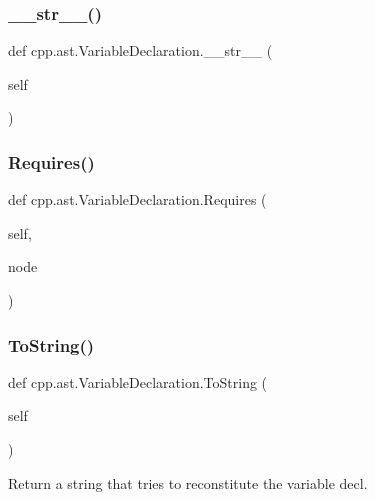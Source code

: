 \subsubsection{\texorpdfstring{\+\_\+\+\_\+str\+\_\+\+\_\+()}{\_\_str\_\_()}}
{\footnotesize\ttfamily def cpp.\+ast.\+Variable\+Declaration.\+\_\+\+\_\+str\+\_\+\+\_\+ (\begin{DoxyParamCaption}\item[{}]{self }\end{DoxyParamCaption})}

\mbox{\label{classcpp_1_1ast_1_1_variable_declaration_aaa1cae7cf191e6d561d861cd053a0bf4}} 
\subsubsection{\texorpdfstring{Requires()}{Requires()}}
{\footnotesize\ttfamily def cpp.\+ast.\+Variable\+Declaration.\+Requires (\begin{DoxyParamCaption}\item[{}]{self,  }\item[{}]{node }\end{DoxyParamCaption})}

\mbox{\label{classcpp_1_1ast_1_1_variable_declaration_a047aa4afddf7b7823a4095cea9477a21}} 
\subsubsection{\texorpdfstring{To\+String()}{ToString()}}
{\footnotesize\ttfamily def cpp.\+ast.\+Variable\+Declaration.\+To\+String (\begin{DoxyParamCaption}\item[{}]{self }\end{DoxyParamCaption})}

\begin{DoxyVerb}Return a string that tries to reconstitute the variable decl.\end{DoxyVerb}
 

